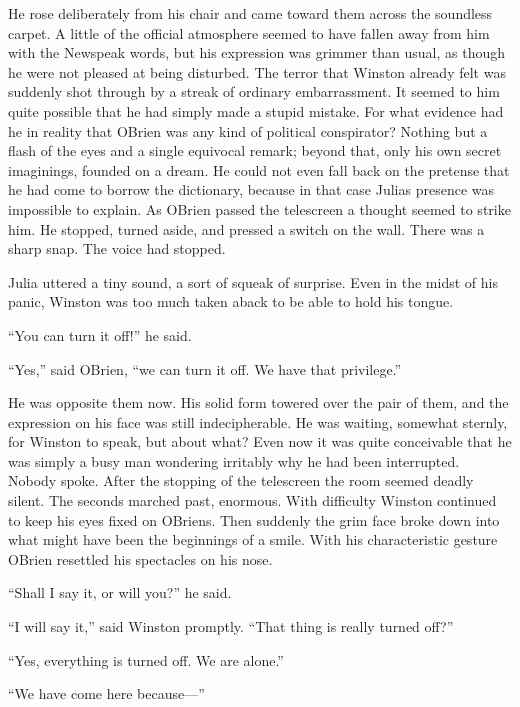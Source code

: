 He rose deliberately from his chair and came toward them across the
soundless carpet. A little of the official atmosphere seemed to have
fallen away from him with the Newspeak words, but his expression was
grimmer than usual, as though he were not pleased at being disturbed.
The terror that Winston already felt was suddenly shot through by a
streak of ordinary embarrassment. It seemed to him quite possible that
he had simply made a stupid mistake. For what evidence had he in reality
that O\textquotesingle Brien was any kind of political conspirator?
Nothing but a flash of the eyes and a single equivocal remark; beyond
that, only his own secret imaginings, founded on a dream. He could not
even fall back on the pretense that he had come to borrow the
dictionary, because in that case Julia\textquotesingle s presence was
impossible to explain. As O\textquotesingle Brien passed the telescreen
a thought seemed to strike him. He stopped, turned aside, and pressed a
switch on the wall. There was a sharp snap. The voice had stopped.

Julia uttered a tiny sound, a sort of squeak of surprise. Even in the
midst of his panic, Winston was too much taken aback to be able to hold
his tongue.

``You can turn it off!'' he said.

``Yes,'' said O\textquotesingle Brien, ``we can turn it off. We have that
privilege.''

He was opposite them now. His solid form towered over the pair of them,
and the expression on his face was still indecipherable. He was waiting,
somewhat sternly, for Winston to speak, but about what? Even now it was
quite conceivable that he was simply a busy man wondering irritably why
he had been interrupted. Nobody spoke. After the stopping of the
telescreen the room seemed deadly silent. The seconds marched past,
enormous. With difficulty Winston continued to keep his eyes fixed on
O\textquotesingle Brien\textquotesingle s. Then suddenly the grim face
broke down into what might have been the beginnings of a smile. With his
characteristic gesture O\textquotesingle Brien resettled his spectacles
on his nose.

``Shall I say it, or will you?'' he said.

``I will say it,'' said Winston promptly. ``That thing is really turned
off?''

``Yes, everything is turned off. We are alone.''

``We have come here because---''

